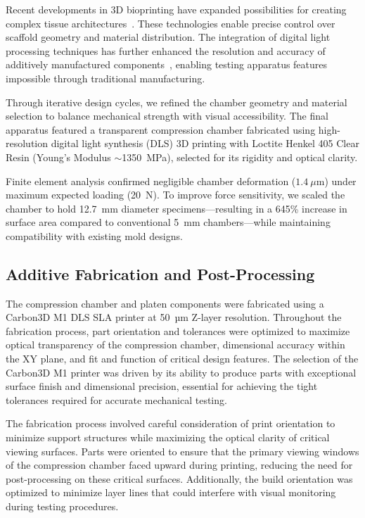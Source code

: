 Recent developments in 3D bioprinting have expanded possibilities for creating complex tissue architectures~\cite{klarmann20243dbioprinting}. These technologies enable precise control over scaffold geometry and material distribution. The integration of digital light processing techniques has further enhanced the resolution and accuracy of additively manufactured components~\cite{hong2020digitallight}, enabling testing apparatus features impossible through traditional manufacturing.

Through iterative design cycles, we refined the chamber geometry and material selection to balance mechanical strength with visual accessibility. The final apparatus featured a transparent compression chamber fabricated using high-resolution digital light synthesis (DLS) 3D printing with Loctite Henkel 405 Clear Resin (Young's Modulus $\sim$1350~MPa), selected for its rigidity and optical clarity.

Finite element analysis confirmed negligible chamber deformation ($1.4~\mu\mathrm{m}$) under maximum expected loading (20~N). To improve force sensitivity, we scaled the chamber to hold 12.7~mm diameter specimens—resulting in a 645\% increase in surface area compared to conventional 5~mm chambers—while maintaining compatibility with existing mold designs.

\subsection{Additive Fabrication and Post-Processing}

The compression chamber and platen components were fabricated using a Carbon3D M1 DLS SLA printer at 50~µm Z-layer resolution. Throughout the fabrication process, part orientation and tolerances were optimized to maximize optical transparency of the compression chamber, dimensional accuracy within the XY plane, and fit and function of critical design features. The selection of the Carbon3D M1 printer was driven by its ability to produce parts with exceptional surface finish and dimensional precision, essential for achieving the tight tolerances required for accurate mechanical testing.

The fabrication process involved careful consideration of print orientation to minimize support structures while maximizing the optical clarity of critical viewing surfaces. Parts were oriented to ensure that the primary viewing windows of the compression chamber faced upward during printing, reducing the need for post-processing on these critical surfaces. Additionally, the build orientation was optimized to minimize layer lines that could interfere with visual monitoring during testing procedures.

